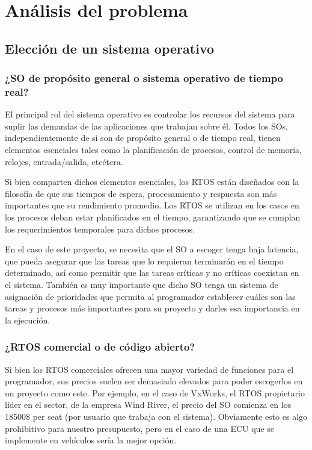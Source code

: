 \chapter{Análisis del problema}

\section{Elección de un sistema operativo}

\subsection{¿SO de propósito general o sistema operativo de tiempo real?}

El principal rol del sistema operativo es controlar los recursos del sistema para suplir las demandas de las aplicaciones que trabajan sobre él. Todos los SOs, independientemente de si son de propósito general o de tiempo real, tienen elementos esenciales tales como la planificación de procesos, control de memoria, relojes, entrada/salida, etcétera. 

Si bien comparten dichos elementos esenciales, los RTOS están diseñados con la filosofía de que sus tiempos de espera, procesamiento y respuesta son más importantes que su rendimiento promedio. Los RTOS se utilizan en los casos en los procesos deban estar planificados en el tiempo, garantizando que se cumplan los requerimientos temporales para dichos procesos. 

En el caso de este proyecto, se necesita que el SO a escoger tenga baja latencia, que pueda asegurar que las tareas que lo requieran terminarán en el tiempo determinado, así como permitir que las tareas críticas y no críticas coexistan en el sistema. También es muy importante que dicho SO tenga un sistema de asignación de prioridades que permita al programador establecer cuáles son las tareas y procesos más importantes para su proyecto y darles esa importancia en la ejecución.

\subsection{¿RTOS comercial o de código abierto?}

Si bien los RTOS comerciales ofrecen una mayor variedad de funciones para el programador, sus precios suelen ser demasiado elevados para poder escogerlos en un proyecto como este. Por ejemplo, en el caso de VxWorks, el RTOS propietario líder en el sector, de la empresa Wind River, el precio del SO comienza en los 18500\$ per seat (por usuario que trabaja con el sistema). Obviamente esto es algo prohibitivo para nuestro presupuesto, pero en el caso de una ECU que se implemente en vehículos sería la mejor opción.\newline

